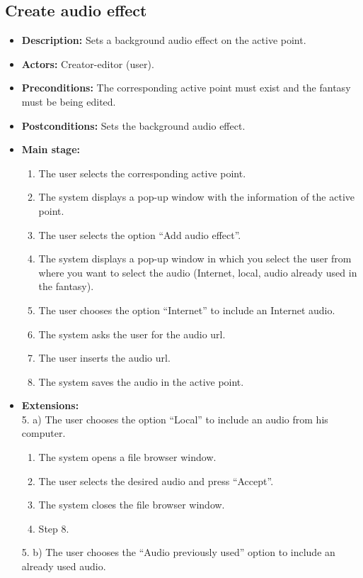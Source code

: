 \subsection{Create audio effect}
\begin{itemize}
	\item \textbf{Description:} Sets a background audio effect on the active point.
	\item \textbf{Actors:} Creator-editor (user).
	\item \textbf{Preconditions:} The corresponding active point must exist and the fantasy must be being edited.
	\item \textbf{Postconditions:} Sets the background audio effect.
	\item \textbf{Main stage:}
	\begin{enumerate}
		\item The user selects the corresponding active point.
		\item The system displays a pop-up window with the information of the active point.
		\item The user selects the option ``Add audio effect''.
		\item The system displays a pop-up window in which you select the user from where you want to select the audio (Internet, local, audio already used in the fantasy).
		\item The user chooses the option ``Internet'' to include an Internet audio.
		\item The system asks the user for the audio url.
		\item The user inserts the audio url.
		\item The system saves the audio in the active point.
	\end{enumerate}
	\item \textbf{Extensions:} \\ 5. a) The user chooses the option ``Local'' to include an audio from his computer.
	\begin{enumerate}
		\item The system opens a file browser window.
		\item The user selects the desired audio and press ``Accept''.
		\item The system closes the file browser window.
		\item Step 8.
	\end{enumerate}
	5. b) The user chooses the ``Audio previously used'' option to include an already used audio.
	\begin{enumerate}

\end{enumerate}
\end{itemize}
